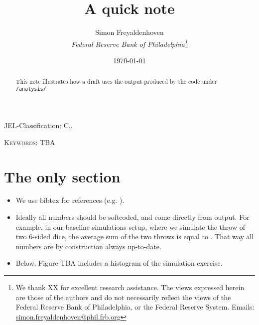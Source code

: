 \documentclass[12pt]{article}
\author{
        Simon Freyaldenhoven\\
        \textit{Federal Reserve Bank of Philadelphia\thanks{We thank XX for excellent research assistance. The views expressed herein are those of the authors and do not necessarily reflect the views of the Federal Reserve Bank of Philadelphia, or the Federal Reserve System. Emails: \href{mailto:simon.freyaldenhoven@phil.frb.org}{simon.freyaldenhoven@phil.frb.org}}}
}
\title{A quick note}
\date{\today}
\theoremstyle{definition}
\begin{document}
\maketitle

\begin{abstract}
\noindent This note illustrates how a draft uses the output produced by the code under \texttt{/analysis/}
\end{abstract}

JEL-Classification: C..

\textsc{Keywords}: TBA

\thispagestyle{empty}
\newpage

\setcounter{page}{1}

\section{The only section}

\begin{itemize}
\item We use bibtex for references (e.g. \cite{Freyaldenhoven2019}). 

\item Ideally all numbers should be softcoded, and come directly from output. For example, in our baseline simulations setup, where we simulate the throw of two 6-sided dice, the average sum of the two throws is equal to \unskip. That way all numbers are by construction always up-to-date.

\item Below, Figure TBA includes a histogram of the simulation exercise.
\end{itemize}




%

\end{document}
